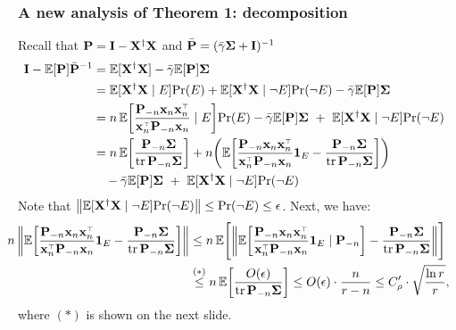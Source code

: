 \documentclass[10pt]{beamer}
\begin{document}
  \begin{frame}
    \frametitle{A new analysis of Theorem 1: decomposition}
Recall that $\mathbf P=\mathbf I-\mathbf X^\dagger\mathbf X$ and $\bar{\mathbf P}=(\bar\gamma\mathbf{\Sigma}+\mathbf I)^{-1}$
\begin{align*}
\hspace{-5mm}\I-\E[\P]\bar\P^{-1}
  &= \E[\X^\dagger\X] - \bar\gamma\E[\P]\Sigmab\\
  &= \E[\X^\dagger\X\mid E]\Pr(E) +
    \E[\X^\dagger\X\mid \neg E]\Pr(\neg E)
    -\bar\gamma\E[\P]\Sigmab\\
  &=n\,\E\bigg[\frac{\P_{-n}\x_n\x_n^\top}{\x_n^\top\P_{-n}\x_n}\mid
    E\bigg]\Pr(E)-\bar\gamma\E[\P]\Sigmab \ +\     \E[\X^\dagger\X\mid \neg
    E]\Pr(\neg E)\\
  &=n\,\E\bigg[\frac{\P_{-n}\Sigmab}{\tr\,\P_{-n}\Sigmab}\bigg] +
    n\bigg(\E\bigg[\frac{\P_{-n}\x_n\x_n^\top}{\x_n^\top\P_{-n}\x_n}\one_E-\frac{\P_{-n}\Sigmab}{\tr\,\P_{-n}\Sigmab}\bigg]\bigg)
  \\
  &\quad-\bar\gamma\E[\P]\Sigmab \ +\  \E[\X^\dagger\X\mid \neg E]\Pr(\neg E)
\end{align*}
Note that $\big\|\mathbb E[\mathbf X^\dagger\mathbf X\mid \neg E]\mathrm{Pr}(\neg
E)\big\|\leq \mathrm{Pr}(\neg E)\leq \epsilon$. Next, we have:
\begin{align*}
\hspace{-8mm}n\,\bigg\|\E\bigg[\frac{\P_{-n}\x_n\x_n^\top}{\x_n^\top\P_{-n}\x_n}\one_E
-\frac{\P_{-n}\Sigmab}{\tr\,\P_{-n}\Sigmab}\bigg]\bigg\|
&\leq n\,\E\Bigg[\bigg\|\E\bigg[\frac{\P_{-n}\x_n\x_n^\top}{\x_n^\top\P_{-n}\x_n}\one_E\mid \P_{-n}\bigg] -\frac{\P_{-n}\Sigmab}{\tr\,\P_{-n}\Sigmab}\bigg\|\Bigg]\\
&\overset{(*)}{\leq} n \, \E\bigg[\frac{O(\epsilon)}{\tr\,\P_{-n}\Sigmab}\bigg]
\leq O(\epsilon)\cdot \frac{n}{r-n} \leq C_\rho' \cdot \sqrt{\frac{\ln r}{r}},
\end{align*}
where $(*)$ is shown on the next slide.
\end{frame}
\end{document}
